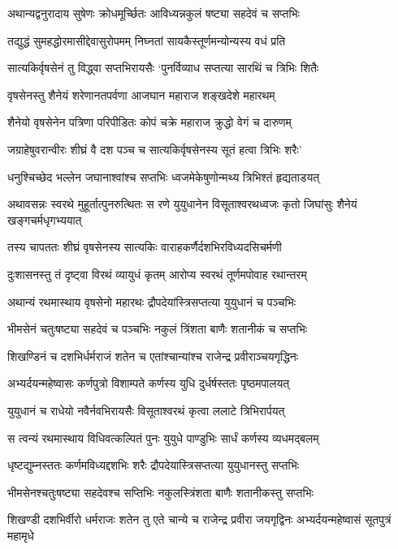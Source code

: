 \twolineshloka
{अथान्यद्वनुरादाय सुषेणः क्रोधमूर्च्छितः}
{आविध्यन्नकुलं षष्ट्या सहदेवं च सप्तभिः}


\twolineshloka
{तद्युद्धं सुमहद्धोरमासीद्देवासुरोपमम्}
{निघ्नतां सायकैस्तूर्णमन्योन्यस्य वधं प्रति}


\twolineshloka
{सात्यकिर्वृषसेनं तु विद्ध्वा सप्तभिरायसैः}
{`पुनर्विव्याध सप्तत्या सारथिं च त्रिभिः शितैः}


\twolineshloka
{वृषसेनस्तु शैनेयं शरेणानतपर्वणा}
{आजघान महाराज शङ्खदेशे महारथम्}


\twolineshloka
{शैनेयो वृषसेनेन पत्रिणा परिपीडितः}
{कोपं चक्रे महाराज क्रुद्धो वेगं च दारुणम्}


\twolineshloka
{जग्राहेषुवरान्वीरः शीघ्रं वै दश पञ्च च}
{सात्यकिर्वृषसेनस्य सूतं हत्वा त्रिभिः शरैः'}


\twolineshloka
{धनुश्चिच्छेद भल्लेन जघानाश्वांश्च सप्तभिः}
{ध्वजमेकेषुणोन्मथ्य त्रिभिश्तं हृद्यताडयत्}


\threelineshloka
{अथावसन्नः स्वरथे मुहूर्तात्पुनरुत्थितः}
{स रणे युयुधानेन विसूताश्वरथध्वजः}
{कृतो जिघांसुः शैनेयं खङ्गचर्मधृगभ्ययात्}


\twolineshloka
{तस्य चापततः शीघ्रं वृषसेनस्य सात्यकिः}
{वाराहकर्णैर्दशभिरविध्यदसिचर्मणी}


\twolineshloka
{दुःशासनस्तु तं दृष्ट्वा विरथं व्यायुधं कृतम्}
{आरोप्य स्वरथं तूर्णमपोवाह रथान्तरम्}


\twolineshloka
{अथान्यं रथमास्थाय वृषसेनो महारथः}
{द्रौपदेयांस्त्रिसप्तत्या युयुधानं च पञ्चभिः}


\twolineshloka
{भीमसेनं चतुःषष्ट्या सहदेवं च पञ्चभिः}
{नकुलं त्रिंशता बाणैः शतानीकं च सप्तभिः}


\twolineshloka
{शिखण्डिनं च दशभिर्धर्मराजं शतेन च}
{एतांश्चान्यांश्च राजेन्द्र प्रवीराञ्चयगृद्धिनः}


\twolineshloka
{अभ्यर्दयन्महेष्वासः कर्णपुत्रो विशाम्पते}
{कर्णस्य युधि दुर्धर्षस्ततः पृष्ठमपालयत्}


\twolineshloka
{युयुधानं च राधेयो नवैर्नवभिरायसैः}
{विसूताश्वरथं कृत्वा ललाटे त्रिभिरार्पयत्}


\twolineshloka
{स त्वन्यं रथमास्थाय विधिवत्कल्पितं पुनः}
{युयुधे पाण्डुभिः सार्धं कर्णस्य व्यधमद्बलम्}


\twolineshloka
{धृष्टद्युम्नस्ततः कर्णमविध्यद्दशभिः शरैः}
{द्रौपदेयास्त्रिसप्तत्या युयुधानस्तु सप्तभिः}


\twolineshloka
{भीमसेनश्चतुःषष्ट्या सहदेवश्च सप्तिभिः}
{नकुलस्त्रिंशता बाणैः शतानीकस्तु सप्तभिः}


\threelineshloka
{शिखण्डी दशभिर्वीरो धर्मराजः शतेन तु}
{एते चान्ये च राजेन्द्र प्रवीरा जयगृद्विनः}
{अभ्यर्दयन्महेष्वासं सूतपुत्रं महामृधे}


